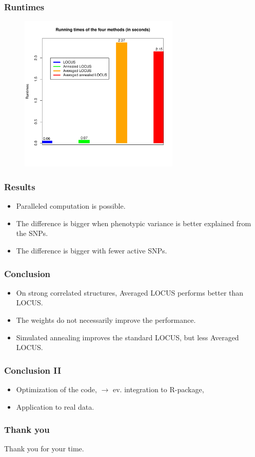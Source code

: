 \documentclass{beamer}
\begin{document}
\begin{frame}
\frametitle{Runtimes}
\begin{figure}
\includegraphics[width=3in]{images/runtimes.pdf}
\end{figure}
\end{frame}

\begin{frame}
\frametitle{Results}
\begin{itemize}
\item Paralleled computation is possible.
\item The difference is bigger when phenotypic variance is better explained from the SNPs.
\item The difference is bigger with fewer active SNPs.
\end{itemize}
\end{frame}

\begin{frame}
\frametitle{Conclusion}
\begin{itemize}
\item On strong correlated structures, Averaged LOCUS performs better than LOCUS.
\item The weights do not necessarily improve the performance.
\item Simulated annealing improves the standard LOCUS, but less Averaged LOCUS.
\end{itemize}
\end{frame}

\begin{frame}
\frametitle{Conclusion II}
\begin{itemize}
\item Optimization of the code, $\rightarrow$ ev. integration to R-package,
\item Application to real data.

\end{itemize}
\end{frame}

\begin{frame}
\frametitle{Thank you}
Thank you for your time.
\end{frame}
\end{document}
